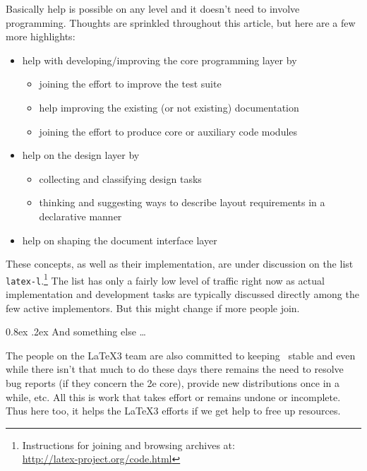 \documentclass{ltnews}
\makeatletter
\renewcommand{\@subheadingfont}{%
   \sffamily\slshape
   \let\LaTeX\cmssLaTeX\let\TeX\cmssTeX
}
\renewcommand{\subsection}{%
   \@startsection
      {subsection}{2}{\z@}{-1.3ex \@plus -1ex \@minus -.2ex}%
      {0.8ex \@plus.2ex}{\@subheadingfont}%
}
\makeatother
\begin{document}
Basically help is possible on any level and it doesn't need to involve programming. Thoughts are sprinkled throughout this article, but here are a few more highlights:
\begin{itemize}
\item help with developing/improving the core programming layer by
\begin{itemize}[nosep]
\item joining the effort to improve the test suite
\item help improving the existing (or not existing) documentation
\item joining the effort to produce core or auxiliary code modules
\end{itemize}
\item help on the design layer by
\begin{itemize}[nosep]
\item collecting and classifying design tasks
\item thinking and suggesting ways to describe layout requirements in a declarative manner
\end{itemize}
\item help on shaping the document interface layer
\end{itemize}
These concepts, as well as their implementation, are under discussion on the list \texttt{latex-l}.\footnote{Instructions for joining and browsing archives at:\\ \url{http://latex-project.org/code.html}}
The list has only a fairly low level of traffic right now as actual implementation and development tasks are typically discussed directly among the few active implementors. But this might change if more people join.

\subsection{And something else \dots}

The people on the \LaTeX3 team are also committed to keeping \LaTeXe\ stable and even while there isn't that much to do these days there remains the need to resolve bug reports (if they concern the 2e core), provide new distributions once in a while, etc. All this is work that takes effort or remains undone or incomplete. Thus here too, it helps the \LaTeX3 efforts if we get help to free up resources.
\end{document}
